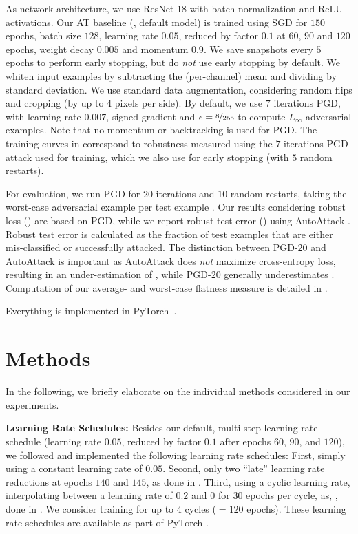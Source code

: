 As network architecture, we use ResNet-18 \cite{HeCVPR2016} with batch normalization \cite{IoffeICML2015} and ReLU activations. Our AT baseline (\ie, default model) is trained using SGD for $150$ epochs, batch size $128$, learning rate $0.05$, reduced by factor $0.1$ at $60$, $90$ and $120$ epochs, weight decay $0.005$ and momentum $0.9$. We save snapshots every $5$ epochs to perform early stopping, but do \emph{not} use early stopping by default. We whiten input examples by subtracting the (per-channel) mean and dividing by standard deviation. We use standard data augmentation, considering random flips and cropping (by up to $4$ pixels per side). By default, we use $7$ iterations PGD, with learning rate $0.007$, signed gradient and $\epsilon = \nicefrac{8}{255}$ to compute $L_\infty$ adversarial examples. Note that no momentum \cite{DongCVPR2018} or backtracking \cite{StutzICML2020} is used for PGD. The training curves in  correspond to robustness measured using the $7$-iterations PGD attack used for training, which we also use for early stopping (with $5$ random restarts).

For evaluation, we run PGD for $20$ iterations and $10$ random restarts, taking the worst-case adversarial example per test example \cite{StutzICML2020}. Our results considering robust loss (\RCE) are based on PGD, while we report robust test error (\RTE) using AutoAttack \cite{CroceARXIV2020}.  Robust test error is calculated as the fraction of test examples that are either mis-classified or successfully attacked. The distinction between PGD-$20$ and AutoAttack is important as AutoAttack does \emph{not} maximize cross-entropy loss, resulting in an under-estimation of \RCE, while PGD-$20$ generally underestimates \RTE. Computation of our average- and worst-case flatness measure is detailed in .

Everything is implemented in PyTorch~\cite{PaszkeNIPSWORK2017}.

\section{Methods}
\label{sec:supp-methods}

In the following, we briefly elaborate on the individual methods considered in our experiments.

\textbf{Learning Rate Schedules:}
%
Besides our default, multi-step learning rate schedule (learning rate $0.05$, reduced by factor $0.1$ after epochs $60$, $90$, and $120$), we followed \cite{PangARXIV2020b} and implemented the following learning rate schedules: First, simply using a constant learning rate of $0.05$. Second, only two ``late'' learning rate reductions at epochs $140$ and $145$, as done in \cite{QinNIPS2019}. Third, using a cyclic learning rate, interpolating between a learning rate of $0.2$ and $0$ for $30$ epochs per cycle, as, \eg, done in \cite{WongARXIV2020}. We consider training for up to $4$ cycles ($=120$ epochs). These learning rate schedules are available as part of PyTorch \cite{PaszkeNIPSWORK2017}.

